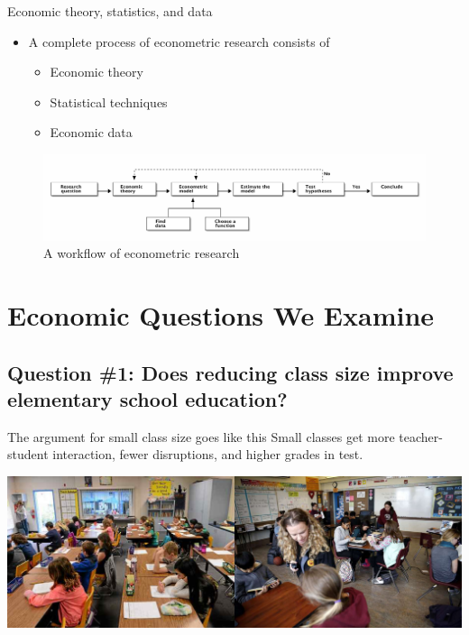 \documentclass[presentation]{beamer}
\begin{document}
\begin{frame}[label={sec:orgb035554}]{Economic theory, statistics, and data}
\begin{itemize}
\item A complete process of econometric research consists of
\begin{itemize}
\item Economic theory
\item Statistical techniques
\item Economic data
\end{itemize}
\end{itemize}

\begin{figure}[htbp]
\centering
\includegraphics[width=1.0\textwidth]{figure/econometric_workflow.png}
\caption{\label{fig:orga839ddb}
A workflow of econometric research}
\end{figure}
\end{frame}


\section{Economic Questions We Examine}
\label{sec:org059bc82}
\setcounter{tocdepth}{1}
\tableofcontents[currentsection]

\subsection*{Question \#1: Does reducing class size improve elementary school education?}
\label{sec:org9fd08aa}

\begin{frame}[label={sec:org9221c45}]{The argument for small class size goes like this}
Small classes get more teacher-student interaction, fewer disruptions,
and higher grades in test. 

\begin{center}
\includegraphics[width=.9\linewidth]{figure/calclassroom_cmp.png}
\end{center}
\end{frame}
\end{document}
